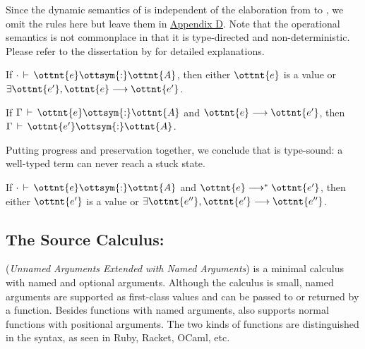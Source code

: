 Since the dynamic semantics of \lambdaiu is independent of the elaboration from
\uaena to \lambdaiu, we omit the rules here but leave them in
\hyperref[sec:appendix-dynamics]{Appendix D}. Note that the operational
semantics is not commonplace in that it is type-directed and non-deterministic.
Please refer to the dissertation by \citet{rehman2023blend} for detailed
explanations.

\begin{theorem}[Progress]
  If $ \cdot   \,\vdash\,  \ottnt{e}  \ottsym{:}  \ottnt{A}$, then either $\ottnt{e}$ is a value or $\exists \ottnt{e'}, \ottnt{e} \longrightarrow \ottnt{e'}$.
\end{theorem}
\begin{theorem}[Preservation]
  If $\Gamma  \,\vdash\,  \ottnt{e}  \ottsym{:}  \ottnt{A}$ and $\ottnt{e} \longrightarrow \ottnt{e'}$, then $\Gamma  \,\vdash\,  \ottnt{e'}  \ottsym{:}  \ottnt{A}$.
\end{theorem}
Putting progress and preservation together, we conclude that \lambdaiu is type-sound:
a well-typed term can never reach a stuck state.
\begin{corollary}
  If $ \cdot   \,\vdash\,  \ottnt{e}  \ottsym{:}  \ottnt{A}$ and $\ottnt{e} \longrightarrow^* \ottnt{e'}$, then either $\ottnt{e'}$ is a value or $\exists \ottnt{e''}, \ottnt{e'} \longrightarrow \ottnt{e''}$.
\end{corollary}

\subsection{The Source Calculus: \uaena} \label{sec:uaena}

\uaena (\emph{Unnamed Arguments Extended with Named Arguments})
is a minimal calculus with named and optional arguments. Although the
calculus is small, named arguments are supported as first-class values and can
be passed to or returned by a function. Besides functions with named
arguments, \uaena also supports normal functions with positional
arguments. The two kinds of functions are distinguished in the syntax, as seen in
Ruby, Racket, OCaml, etc.


